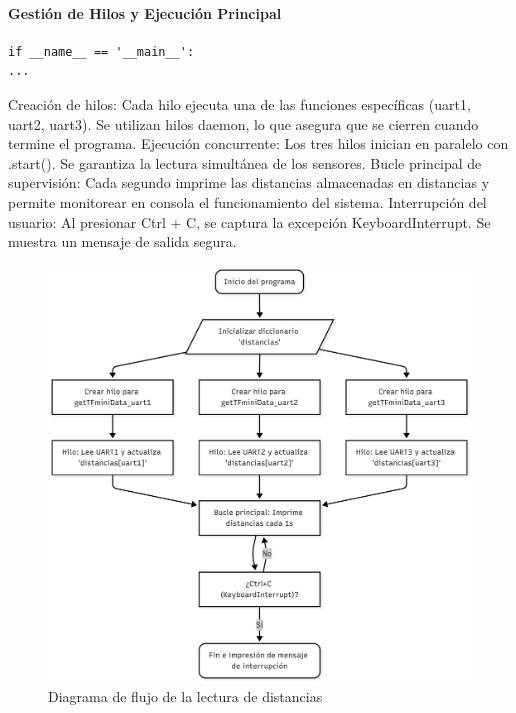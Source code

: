 \documentclass[12pt,a4paper]{article}
\begin{document}
\paragraph{Gestión de Hilos y Ejecución Principal}
\begin{verbatim}
if __name__ == '__main__':
...
\end{verbatim}
Creación de hilos: Cada hilo ejecuta una de las funciones específicas (uart1, uart2, uart3). Se utilizan hilos daemon, lo que asegura que se cierren cuando termine el programa. Ejecución concurrente: Los tres hilos inician en paralelo con .start(). Se garantiza la lectura simultánea de los sensores. Bucle principal de supervisión: Cada segundo imprime las distancias almacenadas en distancias y permite monitorear en consola el funcionamiento del sistema. Interrupción del usuario: Al presionar Ctrl + C, se captura la excepción KeyboardInterrupt. Se muestra un mensaje de salida segura.

\begin{figure}[H]
\noindent\hspace*{-0.7in}%
\includegraphics[width=1.2\linewidth,height=1.1\linewidth]{Carpeta tecnica/diagrama de flujo TFmini3.png}
\caption{Diagrama de flujo de la lectura de distancias}
\end{figure}
\end{document}
